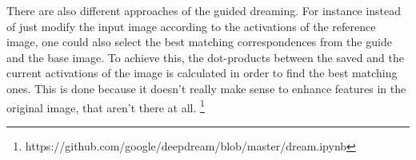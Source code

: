 There are also different approaches of the guided dreaming.
For instance instead of just modify the input image according to the activations of the reference image, one could also select the best matching correspondences from the guide and the base image.
To achieve this, the dot-products between the saved and the current activations of the image is calculated in order to find the best matching ones.
This is done because it doesn't really make sense to enhance features in the original image, that aren't there at all.  \footnote{https://github.com/google/deepdream/blob/master/dream.ipynb}



